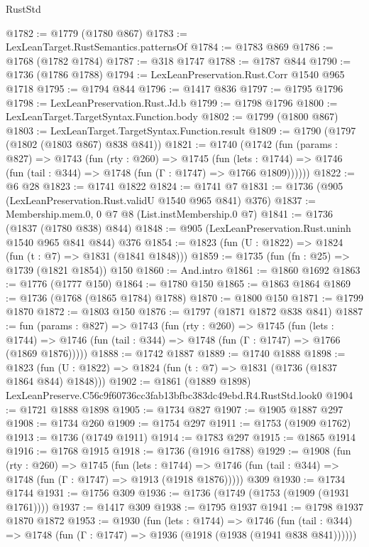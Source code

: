 \begin{lexlean}{RustStd}
\begin{coremodule}
@1782 := @1779 (@1780 @867)
@1783 := LexLeanTarget.RustSemantics.patternsOf
@1784 := @1783 @869
@1786 := @1768 (@1782 @1784)
@1787 := @318 @1747
@1788 := @1787 @844
@1790 := @1736 (@1786 @1788)
@1794 := LexLeanPreservation.Rust.Corr @1540 @965 @1718
@1795 := @1794 @844
@1796 := @1417 @836
@1797 := @1795 @1796
@1798 := LexLeanPreservation.Rust.Jd.b
@1799 := @1798 @1796
@1800 := LexLeanTarget.TargetSyntax.Function.body
@1802 := @1799 (@1800 @867)
@1803 := LexLeanTarget.TargetSyntax.Function.result
@1809 := @1790 (@1797 (@1802 (@1803 @867) @838 @841))
@1821 := @1740
    (@1742
      (fun (params : @827) =>
      @1743
        (fun (rty : @260) =>
        @1745
          (fun (lets : @1744) =>
          @1746 (fun (tail : @344) => @1748 (fun (Γ : @1747) => @1766 @1809))))))
@1822 := @6 @28
@1823 := @1741 @1822
@1824 := @1741 @7
@1831 := @1736 (@905 (LexLeanPreservation.Rust.validU @1540 @965 @841) @376)
@1837 := Membership.mem.{0, 0} @7 @8 (List.instMembership.{0} @7)
@1841 := @1736 (@1837 (@1780 @838) @844)
@1848 := @905 (LexLeanPreservation.Rust.uninh @1540 @965 @841 @844) @376
@1854 := @1823 (fun (U : @1822) => @1824 (fun (t : @7) => @1831 (@1841 @1848)))
@1859 := @1735 (fun (fn : @25) => @1739 (@1821 @1854)) @150
@1860 := And.intro
@1861 := @1860 @1692
@1863 := @1776 (@1777 @150)
@1864 := @1780 @150
@1865 := @1863 @1864
@1869 := @1736 (@1768 (@1865 @1784) @1788)
@1870 := @1800 @150
@1871 := @1799 @1870
@1872 := @1803 @150
@1876 := @1797 (@1871 @1872 @838 @841)
@1887 := fun (params : @827) =>
  @1743
    (fun (rty : @260) =>
    @1745
      (fun (lets : @1744) =>
      @1746 (fun (tail : @344) => @1748 (fun (Γ : @1747) => @1766 (@1869 @1876)))))
@1888 := @1742 @1887
@1889 := @1740 @1888
@1898 := @1823 (fun (U : @1822) => @1824 (fun (t : @7) => @1831 (@1736 (@1837 @1864 @844) @1848)))
@1902 := @1861 (@1889 @1898) LexLeanPreserve.C56c9f60736cc3fab13bfbc383dc49ebd.R4.RustStd.look0
@1904 := @1721 @1888 @1898
@1905 := @1734 @827
@1907 := @1905 @1887 @297
@1908 := @1734 @260
@1909 := @1754 @297
@1911 := @1753 (@1909 @1762)
@1913 := @1736 (@1749 @1911)
@1914 := @1783 @297
@1915 := @1865 @1914
@1916 := @1768 @1915
@1918 := @1736 (@1916 @1788)
@1929 := @1908
    (fun (rty : @260) =>
    @1745
      (fun (lets : @1744) =>
      @1746 (fun (tail : @344) => @1748 (fun (Γ : @1747) => @1913 (@1918 @1876)))))
    @309
@1930 := @1734 @1744
@1931 := @1756 @309
@1936 := @1736 (@1749 (@1753 (@1909 (@1931 @1761))))
@1937 := @1417 @309
@1938 := @1795 @1937
@1941 := @1798 @1937 @1870 @1872
@1953 := @1930
    (fun (lets : @1744) =>
    @1746 (fun (tail : @344) => @1748 (fun (Γ : @1747) => @1936 (@1918 (@1938 (@1941 @838 @841))))))

\end{coremodule}
\end{lexlean}
